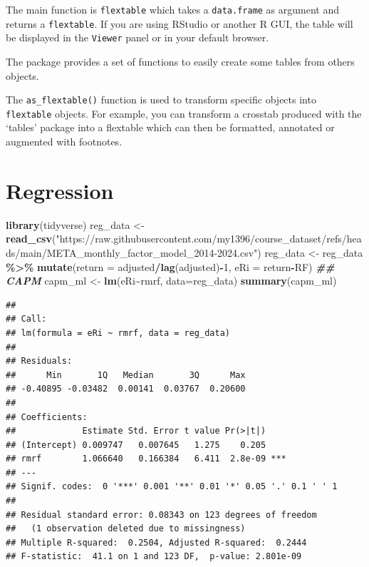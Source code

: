 \documentclass[
  a4paper,
  twoside,
  openright]{book}
\newenvironment{Shaded}{\begin{snugshade}}{\end{snugshade}}
\newcommand{\AttributeTok}[1]{\textcolor[rgb]{0.13,0.29,0.53}{#1}}
\newcommand{\DecValTok}[1]{\textcolor[rgb]{0.00,0.00,0.81}{#1}}
\newcommand{\DocumentationTok}[1]{\textcolor[rgb]{0.56,0.35,0.01}{\textbf{\textit{#1}}}}
\newcommand{\FunctionTok}[1]{\textcolor[rgb]{0.13,0.29,0.53}{\textbf{#1}}}
\newcommand{\NormalTok}[1]{#1}
\newcommand{\OtherTok}[1]{\textcolor[rgb]{0.56,0.35,0.01}{#1}}
\newcommand{\SpecialCharTok}[1]{\textcolor[rgb]{0.81,0.36,0.00}{\textbf{#1}}}
\newcommand{\StringTok}[1]{\textcolor[rgb]{0.31,0.60,0.02}{#1}}
\theoremstyle{definition}
\theoremstyle{definition}
\theoremstyle{definition}
\theoremstyle{definition}
\theoremstyle{remark}
\begin{document}
The main function is \texttt{flextable} which takes a \texttt{data.frame} as argument and returns a \texttt{flextable}. If you are using RStudio or another R GUI, the table will be displayed in the \texttt{Viewer} panel or in your default browser.

The package provides a set of functions to easily create some tables from others objects.

The \texttt{as\_flextable()} function is used to transform specific objects into \texttt{flextable} objects. For example, you can transform a crosstab produced with the `tables' package into a flextable which can then be formatted, annotated or augmented with footnotes.

\chapter{Regression}\label{regression}

\begin{Shaded}
\begin{Highlighting}[]
\FunctionTok{library}\NormalTok{(tidyverse)}
\NormalTok{reg\_data }\OtherTok{\textless{}{-}} \FunctionTok{read\_csv}\NormalTok{(}\StringTok{"https://raw.githubusercontent.com/my1396/course\_dataset/refs/heads/main/META\_monthly\_factor\_model\_2014{-}2024.csv"}\NormalTok{)}
\NormalTok{reg\_data }\OtherTok{\textless{}{-}}\NormalTok{ reg\_data }\SpecialCharTok{\%\textgreater{}\%} 
    \FunctionTok{mutate}\NormalTok{(}\AttributeTok{return =}\NormalTok{ adjusted}\SpecialCharTok{/}\FunctionTok{lag}\NormalTok{(adjusted)}\SpecialCharTok{{-}}\DecValTok{1}\NormalTok{,}
           \AttributeTok{eRi =}\NormalTok{ return}\SpecialCharTok{{-}}\NormalTok{RF)}
\DocumentationTok{\#\# CAPM}
\NormalTok{capm\_ml }\OtherTok{\textless{}{-}} \FunctionTok{lm}\NormalTok{(eRi}\SpecialCharTok{\textasciitilde{}}\NormalTok{rmrf, }\AttributeTok{data=}\NormalTok{reg\_data)}
\FunctionTok{summary}\NormalTok{(capm\_ml)}
\end{Highlighting}
\end{Shaded}

\begin{verbatim}
## 
## Call:
## lm(formula = eRi ~ rmrf, data = reg_data)
## 
## Residuals:
##      Min       1Q   Median       3Q      Max 
## -0.40895 -0.03482  0.00141  0.03767  0.20600 
## 
## Coefficients:
##             Estimate Std. Error t value Pr(>|t|)    
## (Intercept) 0.009747   0.007645   1.275    0.205    
## rmrf        1.066640   0.166384   6.411  2.8e-09 ***
## ---
## Signif. codes:  0 '***' 0.001 '**' 0.01 '*' 0.05 '.' 0.1 ' ' 1
## 
## Residual standard error: 0.08343 on 123 degrees of freedom
##   (1 observation deleted due to missingness)
## Multiple R-squared:  0.2504, Adjusted R-squared:  0.2444 
## F-statistic:  41.1 on 1 and 123 DF,  p-value: 2.801e-09
\end{verbatim}
\end{document}
